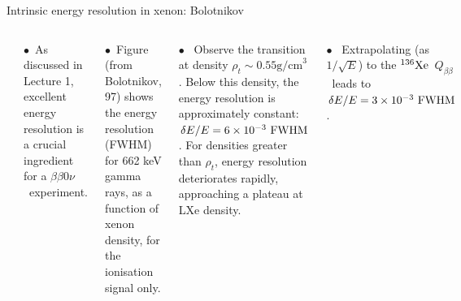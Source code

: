 \documentclass [aspectratio=169]{beamer}
\newcommand{\bbonu}{\ensuremath{\beta\beta0\nu}}
\newcommand{\qbb}{\ensuremath{Q_{\beta\beta}}}
\newcommand{\XE}{\ensuremath{{}^{136}{\rm Xe}}}
\begin{document}
\begin{frame}{Intrinsic energy resolution in xenon: Bolotnikov}
\begin{columns}
\includegraphics[scale=0.60]{energy-resolution-density.png}

$\bullet$~As discussed in Lecture 1, excellent energy resolution is a crucial ingredient for a  \bbonu\ experiment. 

$\bullet$~Figure (from Bolotnikov, 97) shows the energy resolution (FWHM)  for  662 keV gamma rays, as a function of xenon density, for the ionisation signal only.

$\bullet$~ Observe the transition at density
$\rho_t \sim 0.55{\mbox{g/cm}^3}$. Below this density, the energy resolution is approximately constant:
$\delta E/E = 6 \times 10^{-3} {\rm ~FWHM}$. For densities greater than $\rho_t$, energy resolution deteriorates rapidly, approaching a plateau at LXe density.

$\bullet$~ Extrapolating (as $1/\sqrt{E}$) to the \XE\ \qbb\ leads to
$\delta E/E = 3 \times 10^{-3} {\rm ~FWHM}$.

\end{columns}
\end{frame}

\end{document}
